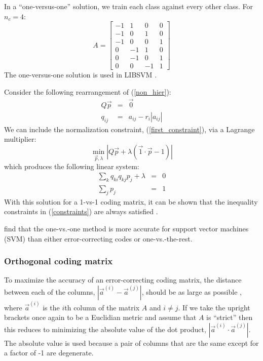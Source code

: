 \documentclass{article}
\begin{document}
In a ``one-versus-one'' solution, we train each class against
every other class. For $n_c=4$:
\begin{equation}
A = 
\begin{bmatrix}
-1 & 1 & 0 & 0 \\
-1 & 0 & 1 & 0 \\
-1 & 0 & 0 & 1 \\
0 & -1 & 1 & 0 \\
0 & -1 & 0 & 1 \\
0 & 0 & -1 & 1
\end{bmatrix}
\end{equation}
The one-versus-one solution is used in LIBSVM \citep{Chang_Lin2011}.

Consider the following rearrangement of (\ref{non_hier}):
\begin{eqnarray}
	Q \vec p & = & \vec 0 \\
	q_{ij} & = & a_{ij} - r_i |a_{ij}|
\end{eqnarray}
We can include the normalization constraint, (\ref{first_constraint}), via
a Lagrange multiplier:
\begin{equation}
	\min_{\vec p, \lambda} | Q \vec p + \lambda(\vec 1 \cdot \vec p - 1)|
\end{equation}
which produces the following linear system:
\begin{eqnarray}
	\sum_k q_{ki} q_{kj} p_j + \lambda & = & 0 \\
	\sum_j p_j & = & 1
\end{eqnarray}
With this solution for a 1-vs-1 coding matrix, it can be shown that the
inequality constraints in (\ref{constraints}) are always satisfied
\citep{Wu_etal2004}.

\citet{Hsu_Lin2002} find that the one-vs.-one method is more accurate
for support vector machines (SVM) than either
error-correcting codes or one-vs.-the-rest.

\subsubsection{Orthogonal coding matrix}

To maximize the accuracy of an error-correcting coding matrix, 
the distance between each of the columns, $| \vec a^{(i)} - \vec a^{(j)} |$, 
should be as large as possible \citep{Allwein_etal2000, Windeatt_Ghaderi2002}, 
where $\vec a^({i})$ is the $i$th column of the matrix $A$ and $i \ne j$. 
If we take the upright brackets once again to be a
Euclidian metric and assume that $A$ is ``strict'' then this 
reduces to minimizing the absolute value of the dot product,
$|\vec a^{(i)} \cdot \vec a^{(j)}|$.
The absolute value is used because a pair of columns that are the same except 
for a factor of -1 are degenerate.
\end{document}
